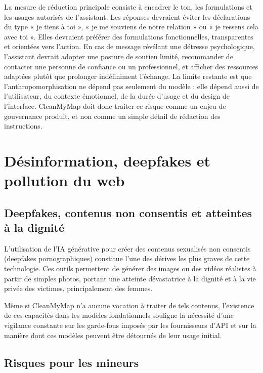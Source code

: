 \documentclass[
  10pt,
  a4paper,
  DIV=11,
  numbers=noendperiod,
  oneside]{scrreprt}
\begin{document}
La mesure de réduction principale consiste à encadrer le ton, les
formulations et les usages autorisés de l'assistant. Les réponses
devraient éviter les déclarations du type « je tiens à toi », « je me
souviens de notre relation » ou « je ressens cela avec toi ». Elles
devraient préférer des formulations fonctionnelles, transparentes et
orientées vers l'action. En cas de message révélant une détresse
psychologique, l'assistant devrait adopter une posture de soutien
limité, recommander de contacter une personne de confiance ou un
professionnel, et afficher des ressources adaptées plutôt que prolonger
indéfiniment l'échange. La limite restante est que
l'anthropomorphisation ne dépend pas seulement du modèle : elle dépend
aussi de l'utilisateur, du contexte émotionnel, de la durée d'usage et
du design de l'interface. CleanMyMap doit donc traiter ce risque comme
un enjeu de gouvernance produit, et non comme un simple détail de
rédaction des instructions.

\section{Désinformation, deepfakes et pollution du
web}\label{duxe9sinformation-deepfakes-et-pollution-du-web}

\subsection{Deepfakes, contenus non consentis et atteintes à la
dignité}\label{deepfakes-contenus-non-consentis-et-atteintes-uxe0-la-dignituxe9}

L'utilisation de l'IA générative pour créer des contenus sexualisés non
consentis (deepfakes pornographiques) constitue l'une des dérives les
plus graves de cette technologie. Ces outils permettent de générer des
images ou des vidéos réalistes à partir de simples photos, portant une
atteinte dévastatrice à la dignité et à la vie privée des victimes,
principalement des femmes.

Même si CleanMyMap n'a aucune vocation à traiter de tels contenus,
l'existence de ces capacités dans les modèles fondationnels souligne la
nécessité d'une vigilance constante sur les garde-fous imposés par les
fournisseurs d'API et sur la manière dont ces modèles peuvent être
détournés de leur usage initial.

\subsection{Risques pour les mineurs}\label{risques-pour-les-mineurs}
\end{document}
